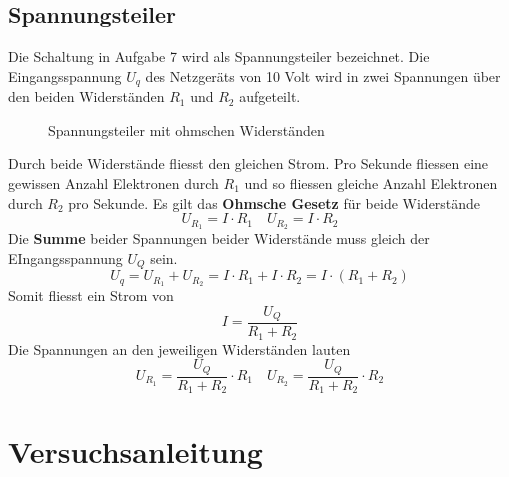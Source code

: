 \subsection{Spannungsteiler}
Die Schaltung in Aufgabe 7 wird als Spannungsteiler bezeichnet. Die Eingangsspannung $U_{q}$ des Netzgeräts von 10 Volt wird in zwei Spannungen über den beiden Widerständen $R_1$ und $R_2$ aufgeteilt. 
\begin{figure}[H]
\centering
{}
\caption{Spannungsteiler mit ohmschen Widerständen}
\end{figure} 
Durch beide Widerstände fliesst den gleichen Strom. Pro Sekunde fliessen eine gewissen Anzahl Elektronen durch $R_1$ und so fliessen gleiche Anzahl Elektronen durch $R_2$ pro Sekunde. Es gilt das \textbf{Ohmsche Gesetz} für beide Widerstände 
\begin{equation*}
\boxed{U_{R_1}=I\cdot R_{1}} \quad \boxed{U_{R_2}=I\cdot R_{2}}
\end{equation*}
Die \textbf{Summe} beider Spannungen beider Widerstände muss gleich der EIngangsspannung $U_Q$ sein. 
\begin{equation*}
U_{q}=U_{R_1}+U_{R_2}=I\cdot R_1+I\cdot R_2=I\cdot \left(R_1+R_2\right)
\end{equation*}
Somit fliesst ein Strom von
\begin{equation*}
I=\dfrac{U_Q}{R_1+R_2}
\end{equation*}
Die Spannungen an den jeweiligen Widerständen lauten
\begin{equation}
\boxed{U_{R_1}=\dfrac{U_Q}{R_1+R_2}\cdot R_1}\quad \boxed{U_{R_2}=\dfrac{U_Q}{R_1+R_2}\cdot R_2}
\end{equation}
\section{Versuchsanleitung}
